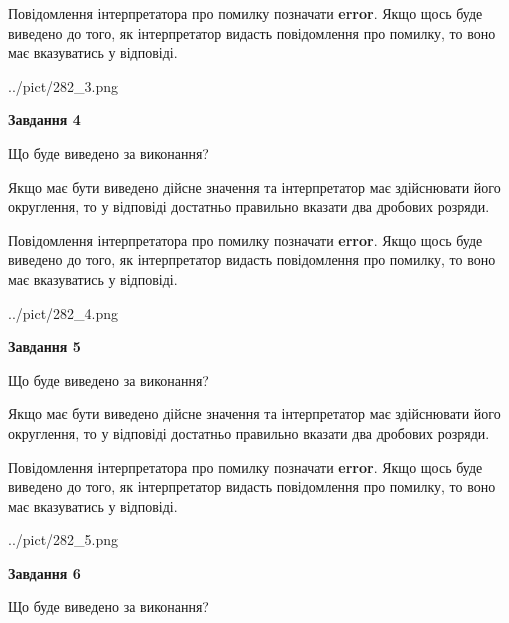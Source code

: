 \documentclass[12pt, ukrainian]{article}
\begin{document}
{\begin {Large}
Повідомлення інтерпретатора про помилку позначати \textbf{error}.
Якщо щось буде виведено до того, як інтерпретатор видасть повідомлення про помилку, 
то воно має вказуватись у відповіді. \par

\begin{center}
	{../pict/282_3.png}
\end{center}
\newpage

{\begin {center}\textbf{Завдання 4}\end {center}}\par
Що буде виведено за виконання? \par

Якщо має бути виведено дійсне значення та інтерпретатор має здійснювати його округлення, 
то у відповіді достатньо правильно вказати два дробових розряди.

Повідомлення інтерпретатора про помилку позначати \textbf{error}.
Якщо щось буде виведено до того, як інтерпретатор видасть повідомлення про помилку, 
то воно має вказуватись у відповіді. \par

\begin{center}
	{../pict/282_4.png}
\end{center}
\newpage

{\begin {center}\textbf{Завдання 5}\end {center}}\par
Що буде виведено за виконання? \par

Якщо має бути виведено дійсне значення та інтерпретатор має здійснювати його округлення, 
то у відповіді достатньо правильно вказати два дробових розряди.

Повідомлення інтерпретатора про помилку позначати \textbf{error}.
Якщо щось буде виведено до того, як інтерпретатор видасть повідомлення про помилку, 
то воно має вказуватись у відповіді. \par

\begin{center}
	{../pict/282_5.png}
\end{center}
\newpage

{\begin {center}\textbf{Завдання 6}\end {center}}\par
Що буде виведено за виконання? \par


\end{Large}}
\end{document}
